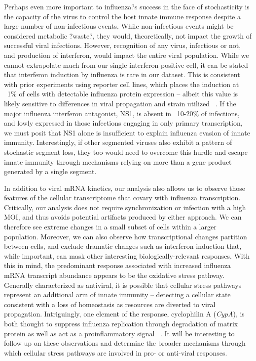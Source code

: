 \documentclass[9pt,lineno]{elife}
\begin{document}
Perhaps even more important to influenza?s success in the face of stochasticity is the capacity of the virus to control the host innate immune response despite a large number of non-infectious events. 
While non-infectious events might be considered metabolic ?waste?, they would, theoretically, not impact the growth of successful viral infections. 
However, recognition of any virus, infectious or not, and production of interferon, would impact the entire viral population. 
While we cannot extrapolate much from our single interferon-positive cell, it can be stated that interferon induction by influenza is rare in our dataset. 
This is consistent with prior experiments using reporter cell lines,  which places the induction at ~1\% of cells with detectable influenza protein expression -- albeit this value is likely sensitive to differences in viral propagation and strain utilized ~\citep{Killip:2017ef, Chen:2010cr}. 
If the major influenza interferon antagonist, NS1, is absent in ~10-20\% of infections, and lowly expressed in those infections engaging in only primary transcription, we must posit that NS1 alone is insufficient to explain influenza evasion of innate immunity. 
Interestingly, if other segmented viruses also exhibit a pattern of stochastic segment loss, they too would need to overcome this hurdle and escape innate immunity through mechanisms relying on more than a gene product generated by a single segment.

In addition to viral mRNA kinetics, our analysis also allows us to observe those features of the cellular transcriptome that covary with influenza transcription.
Critically, our analysis does not require synchronization or infection with a high MOI, and thus avoids potential artifacts produced by either approach. 
We can therefore see extreme changes in a small subset of cells within a larger population.
Moreover, we can also observe how transcriptional changes partition between cells, and exclude dramatic changes such as interferon induction that, while important, can mask other interesting biologically-relevant responses. 
With this in mind, the predominant response associated with increased influenza mRNA transcript abundance appears to be the oxidative stress pathway. 
Generally characterized as antiviral, it is possible that cellular stress pathways represent an additional arm of innate immunity -- detecting a cellular state consistent with a loss of homeostasis as resources are diverted to viral propagation. 
Intriguingly, one element of the response, cyclophilin A (\emph{CypA}), is both thought to suppress influenza replication through degradation of matrix protein as well as act as a proinflammatory signal ~\citep{Liu:2009er, Jin:2004ii}.
It will be interesting to follow up on these observations and determine the broader mechanisms through which cellular stress pathways are involved in pro- or anti-viral responses.
\end{document}
